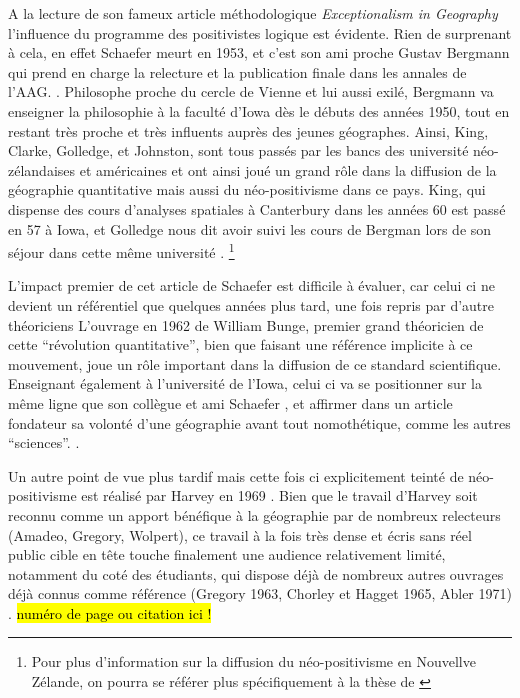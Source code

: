A la lecture de son fameux article méthodologique \textit{Exceptionalism in Geography} l'influence du programme des positivistes logique est évidente. Rien de surprenant à cela, en effet Schaefer meurt en 1953, et c'est son ami proche Gustav Bergmann qui prend en charge la relecture et la publication finale dans les annales de l'AAG. \autocite[32]{Gregory1978}. Philosophe proche du cercle de Vienne et lui aussi exilé, Bergmann va enseigner la philosophie à la faculté d'Iowa dès le débuts des années 1950, tout en restant très proche et très influents auprès des jeunes géographes.\autocite[192]{Buttimer1983} Ainsi, King, Clarke, Golledge, et Johnston, sont tous passés par les bancs des université néo-zélandaises et américaines et ont ainsi joué un grand rôle dans la diffusion de la géographie quantitative mais aussi du néo-positivisme dans ce pays. King, qui dispense des cours d'analyses spatiales à Canterbury dans les années 60 est passé en 57 à Iowa, et Golledge nous dit avoir suivi les cours de Bergman lors de son séjour dans cette même université \autocite[95-96]{Bailly2000}. \footnote{Pour plus d'information sur la diffusion du néo-positivisme en Nouvellve Zélande, on pourra se référer plus spécifiquement à la thèse de \textcite{Hammond1992}}

L'impact premier de cet article de Schaefer est difficile à évaluer, car celui ci ne devient un référentiel que quelques années plus tard, une fois repris par d'autre théoriciens \autocite[32]{Gregory1978} L'ouvrage en 1962 de William Bunge, premier grand théoricien de cette \enquote{révolution quantitative}, bien que faisant une référence implicite à ce mouvement, joue un rôle important dans la diffusion de ce standard scientifique. Enseignant également à l'université de l'Iowa, celui ci va se positionner sur la même ligne que son collègue et ami Schaefer \autocite{Goodchild2001}, et affirmer dans un article fondateur \autocite{Bunge1962} sa volonté d'une géographie avant tout nomothétique, comme les autres \enquote{sciences}. \autocite{Bunge1979} \autocite{Claval2003} \autocite[429-430]{Gregory2009}. 

Un autre point de vue plus tardif mais cette fois ci explicitement teinté de néo-positivisme est réalisé par Harvey en 1969 \autocite{Harvey1969}. Bien que le travail d'Harvey soit reconnu comme un apport bénéfique à la géographie par de nombreux relecteurs (Amadeo, Gregory, Wolpert), ce travail à la fois très dense et écris sans réel public cible en tête touche finalement une audience relativement limité, notamment du coté des étudiants, qui dispose déjà de nombreux autres ouvrages déjà connus comme référence (Gregory 1963, Chorley et Hagget 1965, Abler 1971) \autocite{Johnston2008}. \hl{numéro de page ou citation ici !}

